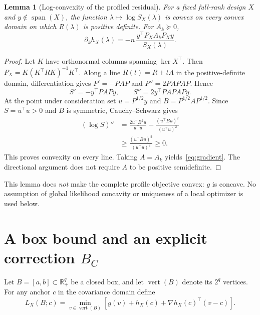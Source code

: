 \documentclass[11pt,a4paper]{article}
\newtheorem{lemma}[theorem]{Lemma}
\theoremstyle{remark}\newtheorem{remark}[theorem]{Remark}
\newcommand{\R}{\mathbb R}
\newcommand{\Span}{\operatorname{span}}
\newcommand{\vertx}{\operatorname{vert}}
\begin{document}
\begin{lemma}[Log-convexity of the profiled residual]\label{lem:convex}
For a fixed full-rank design $X$ and $y\notin\Span(X)$, the function
$\lambda\mapsto\log S_X(\lambda)$ is convex on every convex domain on which
$R(\lambda)$ is positive definite. For $A_k\succeq0$,
\begin{equation}\label{eq:gradient}
\partial_k h_X(\lambda)
=-n\,\frac{y^\top P_X A_kP_Xy}{S_X(\lambda)}.
\end{equation}
\end{lemma}
\begin{proof}
Let $K$ have orthonormal columns spanning $\ker X^\top$. Then
$P_X=K(K^\top RK)^{-1}K^\top$. Along a line $R(t)=R+tA$ in the positive-definite
domain, differentiation gives $P'=-PAP$ and $P''=2PAPAP$. Hence
\[
S'=-y^\top PAPy,\qquad S''=2y^\top PAPAPy.
\]
At the point under consideration set $u=P^{1/2}y$ and $B=P^{1/2}AP^{1/2}$. Since
$S=u^\top u>0$ and $B$ is symmetric, Cauchy--Schwarz gives
\begin{align*}
(\log S)''
&=\frac{2u^\top B^2u}{u^\top u}
 -\frac{(u^\top Bu)^2}{(u^\top u)^2}\\
&\geq\frac{(u^\top Bu)^2}{(u^\top u)^2}\geq0.
\end{align*}
This proves convexity on every line. Taking $A=A_k$ yields~\eqref{eq:gradient}.
The directional argument does not require $A$ to be positive semidefinite.
\end{proof}

This lemma does \emph{not} make the complete profile objective convex: $g$ is
concave. No assumption of global likelihood concavity or uniqueness of a local
optimizer is used below.

\section{A box bound and an explicit correction \texorpdfstring{$B_C$}{B-C}}
Let $B=[a,b]\subset\R_+^q$ be a closed box, and let $\vertx(B)$ denote its $2^q$
vertices. For any anchor $c$ in the covariance domain define
\begin{equation}\label{eq:box}
L_X(B;c)=\min_{v\in\vertx(B)}
\left[g(v)+h_X(c)+\nabla h_X(c)^\top(v-c)\right].
\end{equation}
\end{document}
